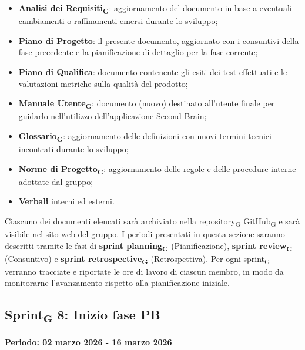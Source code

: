 \documentclass[11pt,a4paper]{article}
\newcommand{\gls}[1]{#1\textsubscript{G}}
\begin{document}
\begin{itemize}
    \item \textbf{\gls{Analisi dei Requisiti}}: aggiornamento del documento in base a eventuali cambiamenti o raffinamenti emersi durante lo sviluppo;
    \item \textbf{Piano di Progetto}: il presente documento, aggiornato con i consuntivi della fase precedente e la pianificazione di dettaglio per la fase corrente;
    \item \textbf{Piano di Qualifica}: documento contenente gli esiti dei test effettuati e le valutazioni metriche sulla qualità del prodotto;
    \item \textbf{\gls{Manuale Utente}}: documento (nuovo) destinato all'utente finale per guidarlo nell'utilizzo dell'applicazione Second Brain;
    \item \textbf{\gls{Glossario}}: aggiornamento delle definizioni con nuovi termini tecnici incontrati durante lo sviluppo;
    \item \textbf{\gls{Norme di Progetto}}: aggiornamento delle regole e delle procedure interne adottate dal gruppo;
    \item \textbf{Verbali} interni ed esterni.
\end{itemize}

\noindent Ciascuno dei documenti elencati sarà archiviato nella \gls{repository} \gls{GitHub} e sarà visibile nel sito web del gruppo.
I periodi presentati in questa sezione saranno descritti tramite le fasi di \textbf{\gls{sprint planning}} (Pianificazione), \textbf{\gls{sprint review}} (Consuntivo) e \textbf{\gls{sprint retrospective}} (Retrospettiva).
Per ogni \gls{sprint} verranno tracciate e riportate le ore di lavoro di ciascun membro, in modo da monitorarne l'avanzamento rispetto alla pianificazione iniziale.

\newpage
\subsection{\gls{Sprint} 8: Inizio fase PB}
{\textbf{Periodo: 02 marzo 2026 - 16 marzo 2026}\par}
\end{document}
